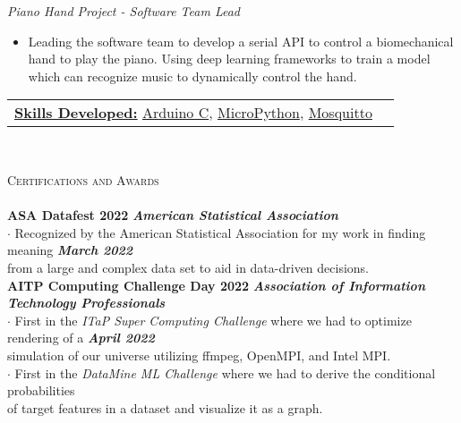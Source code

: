 \documentclass[a4paper]{article}
\newcommand{\lineunder} {
    \vspace*{-8pt} \\
    \hspace*{-18pt} \hrulefill \\
}
\newcommand{\header} [1] {
    {\hspace*{-18pt}\vspace*{6pt} \textsc{#1}}
    \vspace*{-6pt} \lineunder
}
\begin{document}
\vspace{1mm}
\textit{Piano Hand Project - Software Team Lead}
\vspace{-1mm}
\begin{itemize} \itemsep 1pt
    \item Leading the software team to develop a serial API to control a biomechanical hand to play the piano. Using deep learning frameworks to train a model which can recognize music to dynamically control the hand.\\
\end{itemize}
\vspace{-1mm}
\begin{tabular}{ l l }
    \underline{\textbf {Skills Developed:}} \href{https://cplusplus.com/}{Arduino C}, \href{https://micropython.org/}{MicroPython}, \href{https://mosquitto.org/}{Mosquitto}
\end{tabular} \\
\vspace*{2mm}

\header{Certifications and Awards}
\textbf{ASA Datafest 2022} \hfill \textbf{\textit{American Statistical Association}}\\
\vspace {1mm}
$\cdot$ Recognized by the American Statistical Association for my work in finding meaning \hfill \textbf{\textit {March 2022}}\\ from a large and complex data set to aid in data-driven decisions. \\
\vspace{2mm}
\textbf{AITP Computing Challenge Day 2022} \hfill \textbf{\textit{Association of Information Technology Professionals}}\\
\vspace {1mm}
$\cdot$ First in the \textit{ITaP Super Computing Challenge} where we had to optimize rendering of a \hfill \textbf{\textit {April 2022}}\\ simulation of our universe utilizing ffmpeg, OpenMPI, and Intel MPI. 
\vspace{2mm}\\
$\cdot$ First in the \textit{DataMine ML Challenge} where we had to derive the conditional probabilities\\ of target features in a dataset and visualize it as a graph.
\vspace*{6.94mm}
\end{document}
